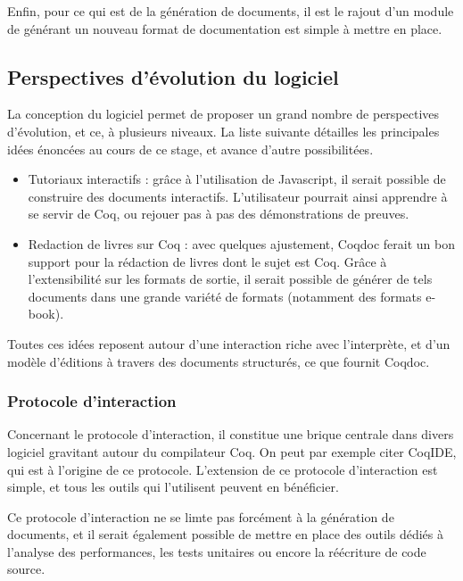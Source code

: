 \documentclass[a4paper, 11pt]{report}
\begin{document}
    Enfin, pour ce qui est de la génération de documents, il est le rajout
    d'un module de générant un nouveau format de documentation est simple à
    mettre en place.

    \subsection{Perspectives d'évolution du logiciel}
    La conception du logiciel permet de proposer un grand nombre de perspectives
    d'évolution, et ce, à plusieurs niveaux. La liste suivante détailles les
    principales idées énoncées au cours de ce stage, et avance d'autre possibilitées.
    \begin{itemize}
      \item Tutoriaux interactifs : grâce à l'utilisation de Javascript,
        il serait possible de construire des documents interactifs.
        L'utilisateur pourrait ainsi apprendre à se servir de Coq, ou rejouer
        pas à pas des démonstrations de preuves.
      \item Redaction de livres sur Coq : avec quelques ajustement, Coqdoc
        ferait un bon support pour la rédaction de livres dont le sujet est
        Coq. Grâce à l'extensibilité sur les formats de sortie, il serait
        possible de générer de tels documents dans une grande variété de
        formats (notamment des formats e-book).
    \end{itemize}

    Toutes ces idées reposent autour d'une interaction riche avec l'interprète,
    et d'un modèle d'éditions à travers des documents structurés, ce que
    fournit Coqdoc.

    \subsubsection{Protocole d'interaction}
    Concernant le protocole d'interaction, il constitue une brique centrale
    dans divers logiciel gravitant autour du compilateur Coq. On peut par exemple
    citer CoqIDE, qui est à l'origine de ce protocole.
    L'extension de ce protocole d'interaction est simple, et tous les outils
    qui l'utilisent peuvent en bénéficier.

    Ce protocole d'interaction ne se limte pas forcément à la génération de
    documents, et il serait également possible de mettre en place des outils
    dédiés à l'analyse des performances, les tests unitaires ou encore la
    réécriture de code source.
\end{document}
